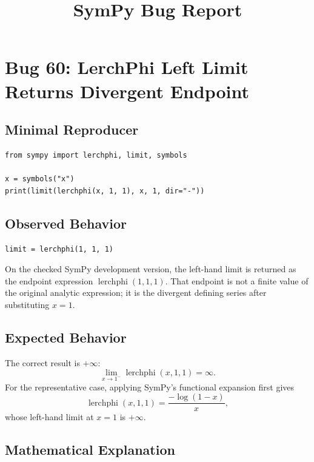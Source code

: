\documentclass[11pt]{article}
\title{SymPy Bug Report}
\author{}
\date{}
\begin{document}
\maketitle

\section{Bug 60: LerchPhi Left Limit Returns Divergent Endpoint}

\subsection{Minimal Reproducer}

\medskip

\begin{lstlisting}[style=bugpython]
from sympy import lerchphi, limit, symbols

x = symbols("x")
print(limit(lerchphi(x, 1, 1), x, 1, dir="-"))
\end{lstlisting}

\subsection{Observed Behavior}

\medskip

\begin{lstlisting}[style=bugpython]
limit = lerchphi(1, 1, 1)
\end{lstlisting}

On the checked SymPy development version, the left-hand limit is returned as the endpoint expression \(\operatorname{lerchphi}(1,1,1)\). That endpoint is not a finite value of the original analytic expression; it is the divergent defining series after substituting \(x=1\).

\subsection{Expected Behavior}

The correct result is \(+\infty\):
\[
\lim_{x\to 1^-} \operatorname{lerchphi}(x,1,1)=\infty .
\]
For the representative case, applying SymPy's functional expansion first gives
\[
\operatorname{lerchphi}(x,1,1)=\frac{-\log(1-x)}{x},
\]
whose left-hand limit at \(x=1\) is \(+\infty\).

\subsection{Mathematical Explanation}
\end{document}
